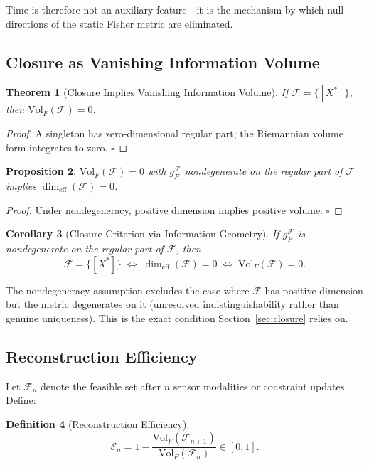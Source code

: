\documentclass[11pt, oneside]{article}
\newtheorem{theorem}{Theorem}[section]
\newtheorem{proposition}[theorem]{Proposition}
\newtheorem{corollary}[theorem]{Corollary}
\newtheorem{definition}[theorem]{Definition}
\begin{document}
Time is therefore not an auxiliary feature---it is the mechanism by which null directions
of the static Fisher metric are eliminated.

\subsection{Closure as Vanishing Information Volume}

\begin{theorem}[Closure Implies Vanishing Information Volume]
\label{thm:closure_volume}
If $\mathcal{F} = \{[X^*]\}$, then $\mathrm{Vol}_F(\mathcal{F}) = 0$.
\end{theorem}
\begin{proof}
A singleton has zero-dimensional regular part; the Riemannian volume form integrates to
zero. $\square$
\end{proof}

\begin{proposition}
\label{prop:volume_converse}
$\mathrm{Vol}_F(\mathcal{F}) = 0$ with $g_F^{\mathcal{F}}$ nondegenerate on the regular
part of $\mathcal{F}$ implies $\dim_{\mathrm{eff}}(\mathcal{F}) = 0$.
\end{proposition}
\begin{proof}
Under nondegeneracy, positive dimension implies positive volume. $\square$
\end{proof}

\begin{corollary}[Closure Criterion via Information Geometry]
\label{cor:closure_criterion}
If $g_F^{\mathcal{F}}$ is nondegenerate on the regular part of $\mathcal{F}$, then
\[
\mathcal{F} = \{[X^*]\}
\;\Longleftrightarrow\;
\dim_{\mathrm{eff}}(\mathcal{F}) = 0
\;\Longleftrightarrow\;
\mathrm{Vol}_F(\mathcal{F}) = 0.
\]
\end{corollary}

The nondegeneracy assumption excludes the case where $\mathcal{F}$ has positive dimension
but the metric degenerates on it (unresolved indistinguishability rather than genuine
uniqueness). This is the exact condition Section~\ref{sec:closure} relies on.

\subsection{Reconstruction Efficiency}

Let $\mathcal{F}_n$ denote the feasible set after $n$ sensor modalities or constraint
updates. Define:

\begin{definition}[Reconstruction Efficiency]
\[
\mathcal{E}_n = 1 - \frac{\mathrm{Vol}_F(\mathcal{F}_{n+1})}{\mathrm{Vol}_F(\mathcal{F}_n)}
\in [0,1].
\]
\end{definition}
\end{document}
